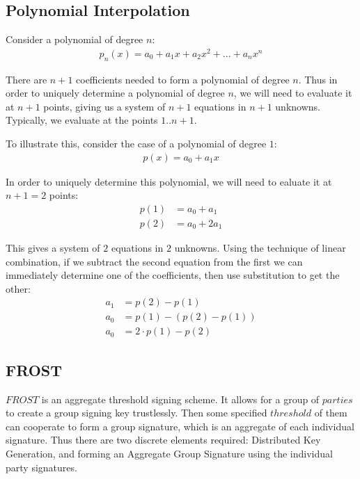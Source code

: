 \documentclass{article}
\begin{document}
\subsection{
  Polynomial Interpolation
}

Consider a polynomial of degree $n$:
\begin{align}
  p_n(x) = a_0 + a_1 x + a_2 x^2 + ... + a_n x^n
\end{align}

There are $n+1$ coefficients needed to form a polynomial of degree $n$.  Thus in order to uniquely determine a polynomial of degree $n$, we will need to evaluate it at $n+1$ points, giving us a system of $n+1$ equations in $n+1$ unknowns.  Typically, we evaluate at the points $1..n+1$.

To illustrate this, consider the case of a polynomial of degree $1$:
\begin{align}
  p(x) = a_0 + a_1 x
\end{align}

In order to uniquely determine this polynomial, we will need to ealuate it at $n+1 = 2$ points:
\begin{align}
  p(1) &= a_0 + a_1\\
  p(2) &= a_0 + 2 a_1 
\end{align}

This gives a system of $2$ equations in $2$ unknowns.  Using the technique of linear combination, if we subtract the second equation from the first we can immediately determine one of the coefficients, then use substitution to get the other:
\begin{align}
  a_1 &= p(2) - p(1)\\
  a_0 &= p(1) - (p(2) - p(1))\\
  a_0 &= 2 \cdot p(1) - p(2)
\end{align}

\newpage
\onecolumn
\subsection{
  FROST
}

$FROST$ is an aggregate threshold signing scheme.  It allows for a group of $parties$ to create a group signing key trustlessly.  Then some specified $threshold$ of them can cooperate to form a group signature, which is an aggregate of each individual signature.  Thus there are two discrete elements required: Distributed Key Generation, and forming an Aggregate Group Signature using the individual party signatures.
\end{document}
